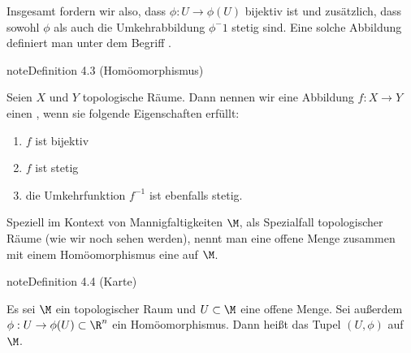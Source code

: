 \documentclass[letterpaper,10pt,english]{jupyterBook}
\begin{document}
\sphinxAtStartPar
Insgesamt fordern wir also, dass \(\phi:U\rightarrow\phi(U)\) bijektiv ist und zusätzlich, dass sowohl \(\phi\) als auch die Umkehrabbildung \(\phi^-1\) stetig sind.
Eine solche Abbildung definiert man unter dem Begriff .
\label{manifolds/manifolds_prelim:definition-5}
\begin{sphinxadmonition}{note}{Definition 4.3 (Homöomorphismus)}



\sphinxAtStartPar
Seien \(X\) und \(Y\) topologische Räume.
Dann nennen wir eine Abbildung \(f \colon X \rightarrow Y\) einen , wenn sie folgende Eigenschaften erfüllt:
\begin{enumerate}
%
\item {} 
\sphinxAtStartPar
\(f\) ist bijektiv

\item {} 
\sphinxAtStartPar
\(f\) ist stetig

\item {} 
\sphinxAtStartPar
die Umkehrfunktion \(f^{-1}\) ist ebenfalls stetig.

\end{enumerate}
\end{sphinxadmonition}

\sphinxAtStartPar
Speziell im Kontext von Mannigfaltigkeiten \(\M\), als Spezialfall topologischer Räume (wie wir noch sehen werden), nennt man eine offene Menge zusammen mit einem Homöomorphismus eine  auf \(\M\).
\label{manifolds/manifolds_prelim:definition-6}
\begin{sphinxadmonition}{note}{Definition 4.4 (Karte)}



\sphinxAtStartPar
Es sei \(\M\) ein topologischer Raum und \(U\subset\M\) eine offene Menge.
Sei außerdem \(\phi:U\rightarrow \phi(U)\subset \R^n\) ein Homöomorphismus.
Dann heißt das Tupel \((U,\phi)\)  auf \(\M\).
\end{sphinxadmonition}
\end{document}
